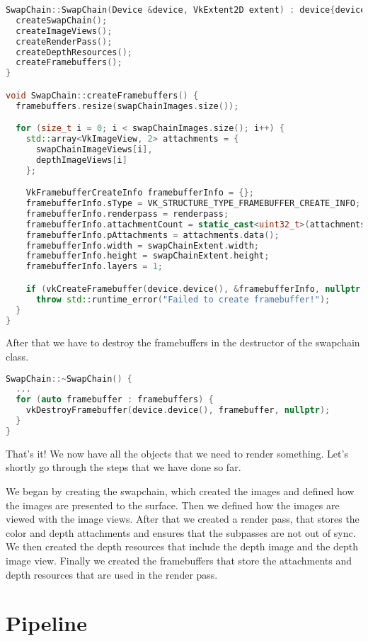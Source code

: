 \documentclass[12pt]{report} \usepackage{preamble}
\begin{document}
\begin{lstlisting}[language=C++]
SwapChain::SwapChain(Device &device, VkExtent2D extent) : device{device}, windowExtent{extent} {
  createSwapChain();
  createImageViews();
  createRenderPass();
  createDepthResources();
  createFramebuffers();
}

void SwapChain::createFramebuffers() {
  framebuffers.resize(swapChainImages.size());

  for (size_t i = 0; i < swapChainImages.size(); i++) {
    std::array<VkImageView, 2> attachments = {
      swapChainImageViews[i],
      depthImageViews[i]
    };

    VkFramebufferCreateInfo framebufferInfo = {};
    framebufferInfo.sType = VK_STRUCTURE_TYPE_FRAMEBUFFER_CREATE_INFO;
    framebufferInfo.renderpass = renderpass;
    framebufferInfo.attachmentCount = static_cast<uint32_t>(attachments.size());
    framebufferInfo.pAttachments = attachments.data();
    framebufferInfo.width = swapChainExtent.width;
    framebufferInfo.height = swapChainExtent.height;
    framebufferInfo.layers = 1;

    if (vkCreateFramebuffer(device.device(), &framebufferInfo, nullptr, &framebuffers[i]) != VK_SUCCESS)
      throw std::runtime_error("Failed to create framebuffer!");
  }
}
\end{lstlisting}

After that we have to destroy the framebuffers in the destructor of the swapchain class.

\begin{lstlisting}[language=C++]
SwapChain::~SwapChain() {
  ...
  for (auto framebuffer : framebuffers) {
    vkDestroyFramebuffer(device.device(), framebuffer, nullptr);
  }
}
\end{lstlisting}

That's it! We now have all the objects that we need to render something. Let's shortly go through the steps that we have
done so far.

We began by creating the swapchain, which created the images and defined how the images are presented to the surface.
Then we defined how the images are viewed with the image views. After that we created a render pass, that stores the
color and depth attachments and ensures that the subpasses are not out of sync. We then created the depth resources that
include the depth image and the depth image view. Finally we created the framebuffers that store the attachments and depth
resources that are used in the render pass.

\section{Pipeline}
\end{document}
